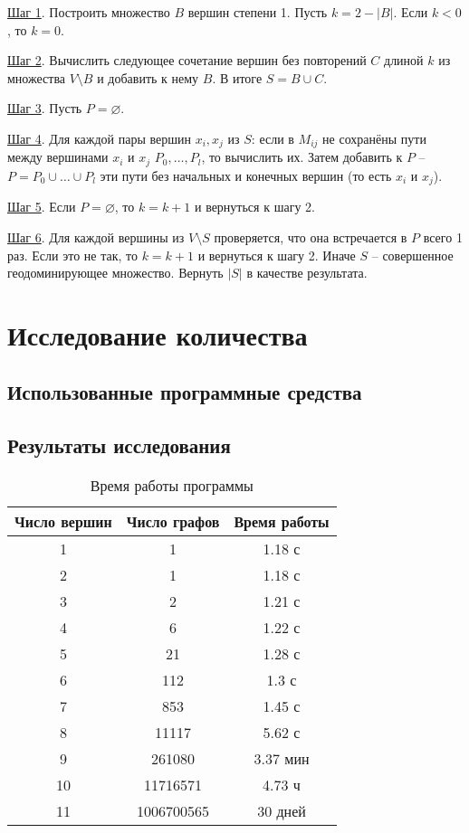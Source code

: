 \documentclass[bachelor, och, nir]{SCWorks}
\begin{document}
\underline{Шаг 1}. Построить множество $B$ вершин степени 1. 
Пусть $k = 2 - |B|$. Если $k < 0$, то $k = 0$. 

\underline{Шаг 2}. Вычислить следующее сочетание вершин без повторений $C$ длиной $k$ из множества
$V \setminus B$ и добавить к нему $B$. В итоге $S = B \cup C$.

\underline{Шаг 3}. Пусть $P = \varnothing$.

\underline{Шаг 4}. Для каждой пары вершин $x_i, x_j$ из $S$: если в $M_{ij}$ не сохранёны пути между вершинами
$x_i$ и $x_j$ $P_0, \dots, P_l$, то вычислить их. Затем добавить к $P$ -- $P = P_0 \cup \dots \cup P_l$ эти пути без начальных и конечных вершин (то есть $x_i$ и $x_j$).

\underline{Шаг 5}. Если $P = \varnothing$, то $k = k + 1$ и вернуться к шагу 2.

\underline{Шаг 6}. Для каждой вершины из $V \setminus S$ проверяется, что она встречается
в $P$ всего 1 раз. Если это не так, то $k = k + 1$ и вернуться к шагу 2. Иначе $S$ --
совершенное геодоминирующее множество. Вернуть $|S|$ в качестве результата.

\section{Исследование количества}
\subsection{Использованные программные средства}

\subsection{Результаты исследования}
\begin{table}[H]
    \begin{tabular}{|c|c|c|}
    \hline
    Число вершин & Число графов & Время работы \\ \hline
    1  & 1 & 1.18 с \\ \hline
    2  & 1 & 1.18 с \\ \hline
    3  & 2 & 1.21 с \\ \hline
    4  & 6 & 1.22 с \\ \hline
    5  & 21 & 1.28 с\\ \hline
    6  & 112 & 1.3 с \\ \hline
    7  & 853 & 1.45 с \\ \hline
    8  & 11117 & 5.62 с \\ \hline
    9  & 261080 & 3.37 мин \\ \hline
    10 & 11716571 & 4.73 ч \\ \hline
    11 & 1006700565 & 30 дней \\ \hline
    \end{tabular}
    \caption{Время работы программы}
\end{table}
\end{document}
